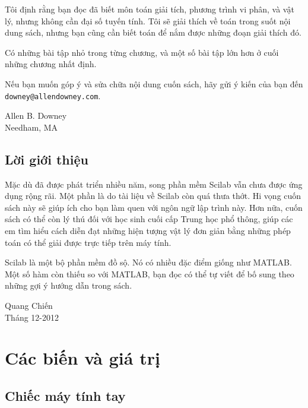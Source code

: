 \documentclass[12pt]{book}
\begin{document}
Tôi định rằng bạn đọc đã biết môn toán giải tích, phương trình vi phân,
và vật lý, nhưng không cần đại số tuyến tính. Tôi sẽ giải thích về toán
trong suốt nội dung sách, nhưng bạn cũng cần biết toán để nắm được
những đoạn giải thích đó.

Có những bài tập nhỏ trong từng chương, và một số bài tập lớn hơn
ở cuối những chương nhất định.

Nếu bạn muốn góp ý và sửa chữa nội dung cuốn sách, hãy gửi ý kiến
của bạn đến 
{\tt downey@allendowney.com}.

\noindent Allen B. Downey \\
\noindent Needham, MA \\

\vspace{0.1in}


\section*{Lời giới thiệu}

Mặc dù đã được phát triển nhiều năm, song phần mềm Scilab vẫn chưa
được ứng dụng rộng rãi. Một phần là do tài liệu về Scilab còn
quá thưa thớt. Hi vọng cuốn sách này sẽ giúp ích cho bạn làm quen
với ngôn ngữ lập trình này. Hơn nữa, cuốn sách có thể còn lý thú
đối với học sinh cuối cấp Trung học phổ thông, giúp các em 
tìm hiểu cách diễn đạt những hiện tượng vật lý đơn giản bằng
những phép toán có thể giải được trực tiếp trên máy tính.

Scilab là một bộ phần mềm đồ sộ. Nó có nhiều đặc điểm giống như
MATLAB. Một số hàm còn thiếu so với MATLAB, bạn đọc có thể 
tự viết để bố sung theo những gợi ý hướng dẫn trong sách.

\begin{flushright}
Quang Chiến \\
Tháng 12-2012
\end{flushright}


\tableofcontents

\mainmatter

\chapter{Các biến và giá trị}

\section{Chiếc máy tính tay}
\label{calc}
\end{document}
